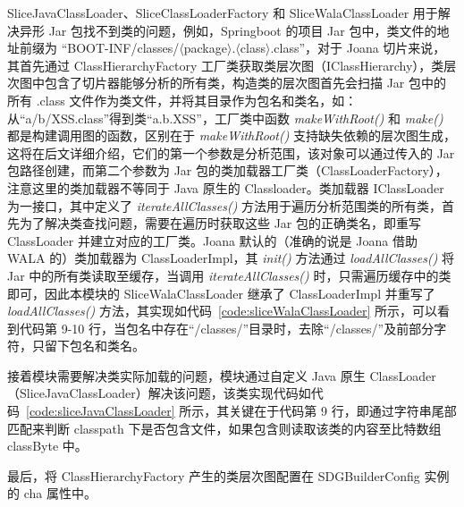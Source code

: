 SliceJavaClassLoader、SliceClassLoaderFactory 和 SliceWalaClassLoader 用于解决异形 Jar 包找不到类的问题，例如，Springboot 的项目 Jar 包中，类文件的地址前缀为 “BOOT-INF/classes/$\langle$package$\rangle$.$\langle$class$\rangle$.class”，对于 Joana 切片来说，其首先通过 ClassHierarchyFactory 工厂类获取类层次图（IClassHierarchy），类层次图中包含了切片器能够分析的所有类，构造类的层次图首先会扫描 Jar 包中的所有 .class 文件作为类文件，并将其目录作为包名和类名，如：从“a/b/XSS.class”得到类“a.b.XSS”，工厂类中函数 \textit{makeWithRoot()} 和 \textit{make()} 都是构建调用图的函数，区别在于 \textit{makeWithRoot()} 支持缺失依赖的层次图生成，这将在后文详细介绍，它们的第一个参数是分析范围，该对象可以通过传入的 Jar 包路径创建，而第二个参数为 Jar 包的类加载器工厂类（ClassLoaderFactory），注意这里的类加载器不等同于 Java 原生的 Classloader。类加载器 IClassLoader 为一接口，其中定义了 \textit{iterateAllClasses()} 方法用于遍历分析范围类的所有类，首先为了解决类查找问题，需要在遍历时获取这些 Jar 包的正确类名，即重写 ClassLoader 并建立对应的工厂类。Joana 默认的（准确的说是 Joana 借助 WALA 的）类加载器为 ClassLoaderImpl，其 \textit{init()} 方法通过 \textit{loadAllClasses()} 将 Jar 中的所有类读取至缓存，当调用 \textit{iterateAllClasses()} 时，只需遍历缓存中的类即可，因此本模块的 SliceWalaClassLoader 继承了 ClassLoaderImpl 并重写了 \textit{loadAllClasses()} 方法，其实现如代码~\ref{code:sliceWalaClassLoader} 所示，可以看到代码第 9-10 行，当包名中存在“/classes/”目录时，去除“/classes/”及前部分字符，只留下包名和类名。

接着模块需要解决类实际加载的问题，模块通过自定义 Java 原生 ClassLoader（SliceJavaClassLoader）解决该问题，该类实现代码如代码~\ref{code:sliceJavaClassLoader} 所示，其关键在于代码第 9 行，即通过字符串尾部匹配来判断 classpath 下是否包含文件，如果包含则读取该类的内容至比特数组 classByte 中。 

最后，将 ClassHierarchyFactory 产生的类层次图配置在 SDGBuilderConfig 实例的 cha 属性中。

\begin{minipage}[!htbp]{0.9\textwidth}
    
\end{minipage}

\begin{minipage}[!htbp]{0.9\textwidth}
    
\end{minipage}


